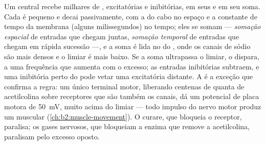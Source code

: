 \begin{proposition}\label{prop:b2:neurons-synapses:integration}
Um  central recebe milhares de , excitatórias e
inibitórias, em seus  e em seu soma. Cada  é pequeno e decai passivamente, com a 
do cabo no espaço e a constante de tempo da membrana (alguns
milissegundos) no tempo; eles se somam --- \emph{somação espacial} de
entradas que chegam juntas, \emph{somação temporal} de entradas que
chegam em rápida sucessão ---, e a soma é lida no \emph{} do , onde os canais de sódio são mais densos e o
limiar é mais baixo. Se a soma ultrapassa o limiar, o  dispara, a
uma frequência que aumenta com o excesso; as entradas inibitórias
subtraem, e uma  inibitória perto do  pode
vetar uma  excitatória distante. A  é a
exceção que confirma a regra: um único terminal motor, liberando
centenas de quanta de acetilcolina sobre receptores que são também os
canais, dá um potencial de placa motora de \qty{50}{mV}, muito acima do
limiar --- todo impulso do nervo motor produz um 
muscular (\cref{ch:b2:muscle-movement}). O curare, que bloqueia o receptor, paralisa; os
gases nervosos, que bloqueiam a enzima que remove a acetilcolina,
paralisam pelo excesso oposto.
\end{proposition}

